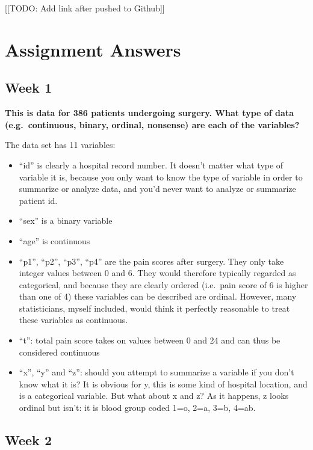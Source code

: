 \documentclass[]{book}
\providecommand{\tightlist}{%
  \setlength{\itemsep}{0pt}\setlength{\parskip}{0pt}}
\begin{document}
{[}{[}TODO: Add link after pushed to Github{]}{]}

\hypertarget{assignment-answers}{%
\chapter{Assignment Answers}\label{assignment-answers}}

\hypertarget{week-1-1}{%
\section{Week 1}\label{week-1-1}}

\textbf{This is data for 386 patients undergoing surgery. What type of data (e.g.~continuous, binary, ordinal, nonsense) are each of the variables?}

The data set has 11 variables:

\begin{itemize}
\tightlist
\item
  ``id'' is clearly a hospital record number. It doesn't matter what type of variable it is, because you only want to know the type of variable in order to summarize or analyze data, and you'd never want to analyze or summarize patient id.
\item
  ``sex'' is a binary variable
\item
  ``age'' is continuous
\item
  ``p1'', ``p2'', ``p3'', ``p4'' are the pain scores after surgery. They only take integer values between 0 and 6. They would therefore typically regarded as categorical, and because they are clearly ordered (i.e.~pain score of 6 is higher than one of 4) these variables can be described are ordinal. However, many statisticians, myself included, would think it perfectly reasonable to treat these variables as continuous.
\item
  ``t'': total pain score takes on values between 0 and 24 and can thus be considered continuous
\item
  ``x'', ``y'' and ``z'': should you attempt to summarize a variable if you don't know what it is? It is obvious for y, this is some kind of hospital location, and is a categorical variable. But what about x and z? As it happens, z looks ordinal but isn't: it is blood group coded 1=o, 2=a, 3=b, 4=ab.
\end{itemize}

\hypertarget{week-2-1}{%
\section{Week 2}\label{week-2-1}}
\end{document}
